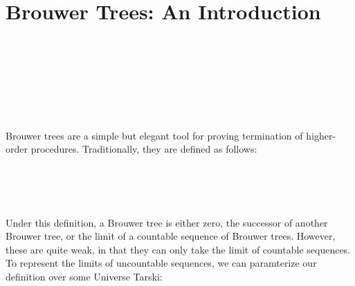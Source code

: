 \section{Brouwer Trees: An Introduction}
\begin{code}[hide]%
%
\>[2]\AgdaSpace{}%
\AgdaSpace{}%
\AgdaSpace{}%
\AgdaSpace{}%
\AgdaSymbol{(}\AgdaSymbol{)}\<%
\\
%
\>[2]\AgdaSpace{}%
\AgdaSpace{}%
\<%
\\
%
\>[2]\AgdaSpace{}%
\AgdaSpace{}%
\<%
\\
%
\>[2]\AgdaSpace{}%
\AgdaSpace{}%
\<%
\\
%
\>[2]\AgdaSpace{}%
\AgdaSpace{}%
\<%
\\
%
\>[2]\AgdaSpace{}%
\AgdaSpace{}%
\<%
\\
\>[0]\<%
\end{code}

Brouwer trees  are a simple but elegant tool for proving termination of higher-order procedures.
Traditionally, they are defined as follows:
\begin{code}%
\>[0][@{}l@{\AgdaIndent{1}}]%
\>[2]\AgdaSpace{}%
\AgdaSpace{}%
\AgdaSymbol{:}\AgdaSpace{}%
\AgdaSpace{}%
\<%
\\
\>[2][@{}l@{\AgdaIndent{0}}]%
\>[4]\AgdaSpace{}%
\AgdaSymbol{:}\AgdaSpace{}%
\<%
\\
%
\>[4]\AgdaSpace{}%
\AgdaSymbol{:}\AgdaSpace{}%
\AgdaSpace{}%
\AgdaSpace{}%
\<%
\\
%
\>[4]\AgdaSpace{}%
\AgdaSymbol{:}\AgdaSpace{}%
\AgdaSymbol{(}\AgdaSpace{}%
\AgdaSpace{}%
\AgdaSymbol{)}\AgdaSpace{}%
\AgdaSpace{}%
\<%
\end{code}
Under this definition, a Brouwer tree is either zero, the successor of another Brouwer tree, or the limit of a countable sequence of Brouwer trees. However, these are quite weak, in that they can only take the limit of countable sequences.
To represent the limits of uncountable sequences, we can paramterize our definition over some Universe \ala Tarski:

